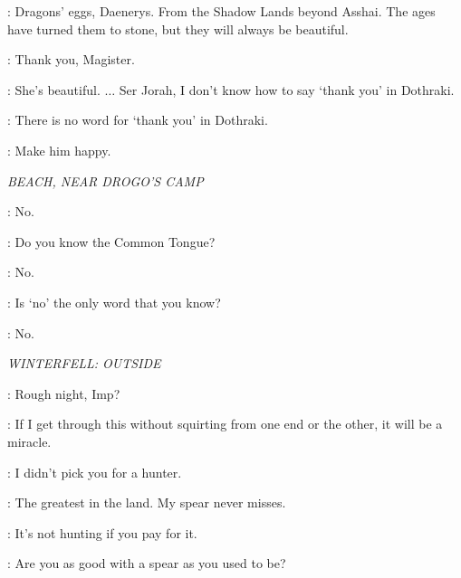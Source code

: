 
\ILLYRIO: Dragons' eggs, Daenerys. From the Shadow Lands beyond Asshai. The ages have turned them to stone, but they will always be beautiful. 

\DAENERYS: Thank you, Magister. 


\DAENERYS: She's beautiful. $\ldots$ Ser Jorah, I don't know how to say `thank you' in Dothraki. 

\JORAH: There is no word for `thank you' in Dothraki. 


\VISERYS: Make him happy. 


\scene

\textit{BEACH, NEAR DROGO'S CAMP} 


\DROGO: No. 

\DAENERYS: Do you know the Common Tongue? 

\DROGO: No. 

\DAENERYS: Is `no' the only word that you know? 

\DROGO: No. 



\scene

\textit{WINTERFELL: OUTSIDE} 


\HOUND: Rough night, Imp? 

\TYRION: If I get through this without squirting from one end or the other, it will be a miracle. 

\HOUND: I didn't pick you for a hunter. 

\TYRION: The greatest in the land. My spear never misses. 

\HOUND: It's not hunting if you pay for it. 


\ROBERT: Are you as good with a spear as you used to be? 

